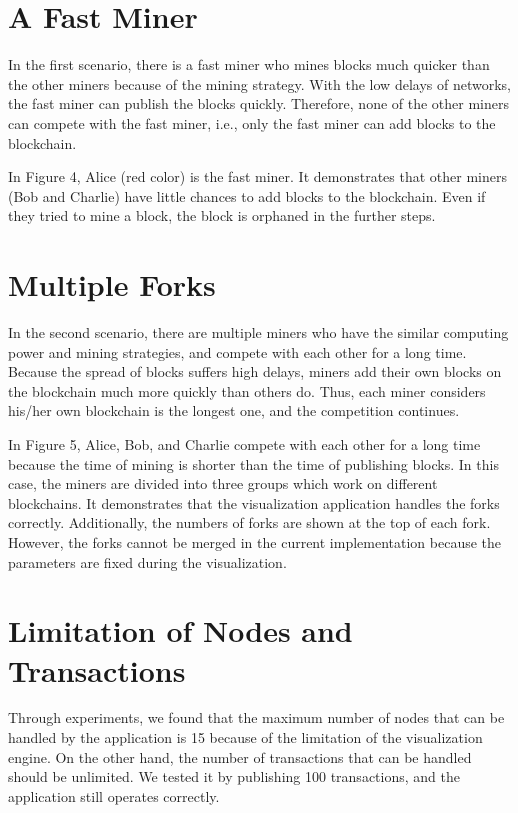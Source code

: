 \section{A Fast Miner}

In the first scenario, there is a fast miner who mines blocks much quicker than the other miners because of the mining strategy. With the low delays of networks, the fast miner can publish the blocks quickly. Therefore, none of the other miners can compete with the fast miner, i.e., only the fast miner can add blocks to the blockchain.

In Figure 4, Alice (red color) is the fast miner. It demonstrates that other miners (Bob and Charlie) have little chances to add blocks to the blockchain. Even if they tried to mine a block, the block is orphaned in the further steps.

\section{Multiple Forks}

In the second scenario, there are multiple miners who have the similar computing power and mining strategies, and compete with each other for a long time. Because the spread of blocks suffers high delays, miners add their own blocks on the blockchain much more quickly than others do. Thus, each miner considers his/her own blockchain is the longest one, and the competition continues.

In Figure 5, Alice, Bob, and Charlie compete with each other for a long time because the time of mining is shorter than the time of publishing blocks. In this case, the miners are divided into three groups which work on different blockchains. It demonstrates that the visualization application handles the forks correctly. Additionally, the numbers of forks are shown at the top of each fork. However, the forks cannot be merged in the current implementation because the parameters are fixed during the visualization.

\section{Limitation of Nodes and Transactions}

Through experiments, we found that the maximum number of nodes that can be handled by the application is 15 because of the limitation of the visualization engine. On the other hand, the number of transactions that can be handled should be unlimited. We tested it by publishing 100 transactions, and the application still operates correctly.

